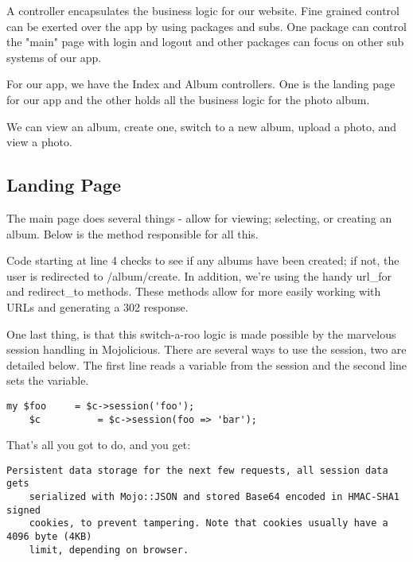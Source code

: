 \documentclass[14pt]{extreport}
\begin{document}
A controller encapsulates the business logic for our website.  Fine grained
control can be exerted over the app by using packages and subs.  One package
can control the "main" page with login and logout and other packages can focus
on other sub systems of our app.

For our app, we have the Index and Album controllers.  One is the landing page for
our app and the other holds all the business logic for the photo album.

We can view an album, create one, switch to a new album, upload a photo, and
view a photo.

\subsection{Landing Page}

The main page does several things - allow for viewing; selecting, or creating
an album.  Below is the method responsible for all this.



Code starting at line 4 checks to see if any albums have been created; if not,
the user is redirected to /album/create.  In addition, we're using the handy
url\_for and redirect\_to methods. These methods allow for more easily working
with URLs and generating a 302 response.

One last thing, is that this switch-a-roo logic is made possible by the
marvelous session handling in Mojolicious.  There are several ways to use the
session, two are detailed below.  The first line reads a variable from the
session and the second line sets the variable.

\begin{lstlisting}[style=BlockStyle]
    my $foo     = $c->session('foo');
    $c          = $c->session(foo => 'bar');
\end{lstlisting}

That's all you got to do, and you get:

\begin{lstlisting}[style=BlockStyle]
    Persistent data storage for the next few requests, all session data gets
    serialized with Mojo::JSON and stored Base64 encoded in HMAC-SHA1 signed
    cookies, to prevent tampering. Note that cookies usually have a 4096 byte (4KB)
    limit, depending on browser.
\end{lstlisting}
\end{document}
